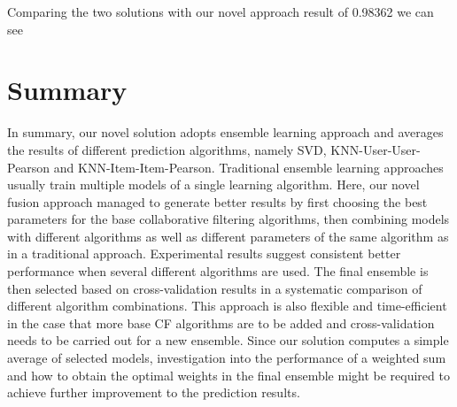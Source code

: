 \documentclass[10pt,conference,compsocconf]{IEEEtran}
\begin{document}
Comparing the two solutions with our novel approach result of 0.98362 we can see

\section{Summary}
In summary, our novel solution adopts ensemble learning approach and averages the results of different prediction algorithms, namely SVD, KNN-User-User-Pearson and KNN-Item-Item-Pearson. Traditional ensemble learning approaches usually train multiple models of a single learning algorithm. Here, our novel fusion approach managed to generate better results by first choosing the best parameters for the base collaborative filtering algorithms, then combining models with different algorithms as well as different parameters of the same algorithm as in a traditional approach. Experimental results suggest consistent better performance when several different algorithms are used. The final ensemble is then selected based on  cross-validation results in a systematic comparison of different algorithm combinations. 
This approach is also flexible and time-efficient in the case that more base CF algorithms are to be added and cross-validation needs to be carried out for a new ensemble. 
Since our solution computes a simple average of selected models, investigation into the performance of a weighted sum and how to obtain the optimal weights in the final ensemble might be required to achieve further improvement to the prediction results.

\nocite{*}


\end{document}
